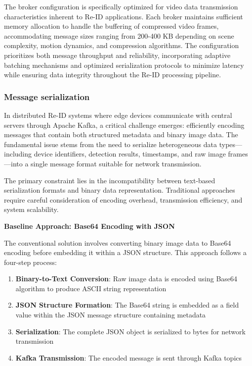 The broker configuration is specifically optimized for video data transmission characteristics inherent to Re-ID applications. Each broker maintains sufficient memory allocation to handle the buffering of compressed video frames, accommodating message sizes ranging from 200-400 KB depending on scene complexity, motion dynamics, and compression algorithms. The configuration prioritizes both message throughput and reliability, incorporating adaptive batching mechanisms and optimized serialization protocols to minimize latency while ensuring data integrity throughout the Re-ID processing pipeline.

\subsubsection{Message serialization}
\label{sec:message_serialization}

In distributed Re-ID systems where edge devices communicate with central servers through Apache Kafka, a critical challenge emerges: efficiently encoding messages that contain both structured metadata and binary image data. The fundamental issue stems from the need to serialize heterogeneous data types—including device identifiers, detection results, timestamps, and raw image frames—into a single message format suitable for network transmission.

The primary constraint lies in the incompatibility between text-based serialization formats and binary data representation. Traditional approaches require careful consideration of encoding overhead, transmission efficiency, and system scalability.

\textbf{Baseline Approach: Base64 Encoding with JSON}

The conventional solution involves converting binary image data to Base64 encoding before embedding it within a JSON structure. This approach follows a four-step process:

\begin{enumerate}
    \item \textbf{Binary-to-Text Conversion}: Raw image data is encoded using Base64 algorithm to produce ASCII string representation
    \item \textbf{JSON Structure Formation}: The Base64 string is embedded as a field value within the JSON message structure containing metadata
    \item \textbf{Serialization}: The complete JSON object is serialized to bytes for network transmission
    \item \textbf{Kafka Transmission}: The encoded message is sent through Kafka topics
\end{enumerate}

